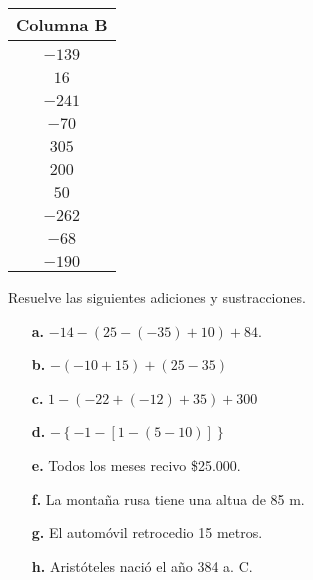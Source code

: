\documentclass[spanish,letterpaper, 11pt, addpoints, answers]{exam}
\begin{document}
\begin{questions}
\begin{minipage}{0.4\linewidth}
\begin{tcolorbox}[colback=white]
\begin{center}
\begin{tabular}{c}
    \end{tabular}
  \end{center}
\end{tcolorbox}
\end{minipage}
\hfill
\begin{minipage}{0.4\linewidth}
  \begin{tcolorbox}[colback=white]
  \begin{center}
    \begin{tabular}{c}
      \textbf{Columna B} \\ \hline \\
      $-139$\\\\
      $16$\\\\
      $-241$\\\\
      $-70$\\\\
      $305$\\\\
      $200$\\\\
      $50$\\\\
      $-262$\\\\
      $-68$\\\\
      $-190$
      
    \end{tabular}
  \end{center}
\end{tcolorbox}
\end{minipage}


  \question Resuelve las siguientes adiciones y sustracciones.
  
  \begin{itemize}
    \item[\textbf{a.}] $-14-(25-(-35)+10)+84$.
    \item[\textbf{b.}] $-(-10+15)+(25-35)$
    \item[\textbf{c.}] $1-(-22+(-12)+35)+300$
    \item[\textbf{d.}] $-\left\{-1-[1-(5-10)]\right\}$
    \item[\textbf{e.}]Todos los meses recivo \$25.000.
    \item[\textbf{f.}]La montaña rusa tiene una altua de 85 m.
    \item[\textbf{g.}]El automóvil retrocedio 15 metros.
    \item[\textbf{h.}]Aristóteles nació el año 384 a. C. 
    \end{itemize}


\end{questions}
\end{document}
